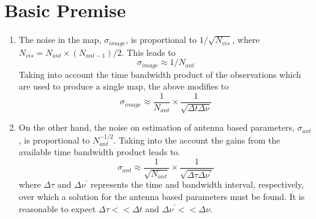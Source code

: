 \documentclass[11pt]{article}
\begin{document}
\section{Basic Premise}
\label{S-intro}
\begin{enumerate}
\item The noise in the map, $\sigma_{image}$, is proportional to $1/\sqrt{N_{vis}}$, where $N_{vis} = N_{ant} \times (N_{ant-1})/2$. 
This leads to 
\begin{equation}
\sigma_{image} \approx1/N_{ant}
\end{equation}
Taking into account the time bandwidth product of the observations which are used to produce a single map, the above modifies to
\begin{equation}
\sigma_{image} \approx\frac{1}{N_{ant}} \times \frac{1}{\sqrt{\Delta t \Delta \nu}}
\end{equation}

\item On the other hand, the noise on estimation of antenna based parameters, $\sigma_{ant}$, is proportional to $N_{ant}^{-1/2}$.
Taking into the account the gains from the available time bandwidth product leads to.
\begin{equation}
\sigma_{ant} \approx\frac{1}{\sqrt{N_{ant}}} \times \frac{1}{\sqrt{\Delta \tau \Delta \nu^{\prime}}}
\end{equation}
where $\Delta \tau$ and $\Delta \nu^{\prime}$ represents the time and bandwidth interval, respectively, over which a solution for the antenna based parameters must be found.
It is reasonable to expect $\Delta \tau << \Delta t$ and $\Delta \nu^{\prime} << \Delta \nu$.


\end{enumerate}
\end{document}
